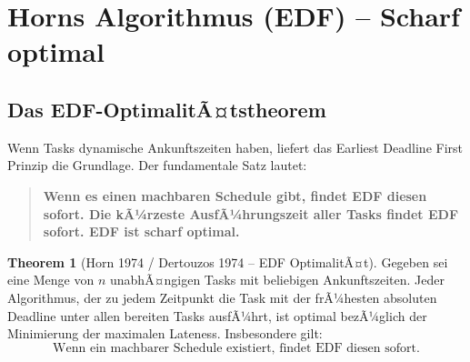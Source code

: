 ﻿\documentclass[a4paper,12pt]{report}
\theoremstyle{definition}
\newtheorem{theorem}{Theorem}[chapter]
\begin{document}
\section{Horns Algorithmus (EDF) -- Scharf optimal}

\subsection{Das EDF-OptimalitÃ¤tstheorem}

Wenn Tasks dynamische Ankunftszeiten haben, liefert das Earliest Deadline First
Prinzip die Grundlage. Der fundamentale Satz lautet:

\begin{quote}
\textbf{Wenn es einen machbaren Schedule gibt, findet EDF diesen sofort. Die kÃ¼rzeste
AusfÃ¼hrungszeit aller Tasks findet EDF sofort. EDF ist scharf optimal.}
\end{quote}

\begin{theorem}[Horn 1974 / Dertouzos 1974 -- EDF OptimalitÃ¤t]
	\label{thm:edf_optimal}
	Gegeben sei eine Menge von $n$ unabhÃ¤ngigen Tasks mit beliebigen Ankunftszeiten.
	Jeder Algorithmus, der zu jedem Zeitpunkt die Task mit der frÃ¼hesten absoluten
	Deadline unter allen bereiten Tasks ausfÃ¼hrt, ist optimal bezÃ¼glich der
	Minimierung der maximalen Lateness. Insbesondere gilt:
	\[
		\text{Wenn ein machbarer Schedule existiert, findet EDF diesen sofort.}
	\]
\end{theorem}
\end{document}
